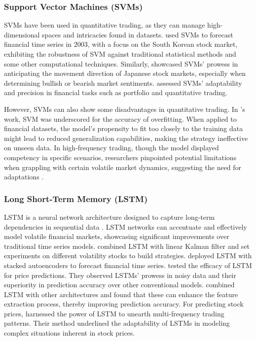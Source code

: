 \documentclass[preprint,12pt]{elsarticle}
\begin{document}
\subsubsection{Support Vector Machines (SVMs)}
SVMs have been used in quantitative trading, as they can manage high-dimensional spaces and intricacies found in datasets. \citet{kim2003financial} used SVMs to forecast financial time series in 2003, with a focus on the South Korean stock market, exhibiting the robustness of SVM against traditional statistical methods and some other computational techniques. Similarly, \citet{huang2005forecasting} showcased SVMs' prowess in anticipating the movement direction of Japanese stock markets, especially when determining bullish or bearish market sentiments. \citet{cavalcante2016computational} assessed SVMs' adaptability and precision in financial tasks such as portfolio and quantitative trading.

However, SVMs can also show some disadvantages in quantitative trading. In \citet{huck2009pairs}'s work, SVM was underscored for the accuracy of overfitting. When applied to financial datasets, the model's propensity to fit too closely to the training data might lead to reduced generalization capabilities, making the strategy ineffective on unseen data. In high-frequency trading, though the model displayed competency in specific scenarios, researchers pinpointed potential limitations when grappling with certain volatile market dynamics, suggesting the need for adaptations \citep{kercheval2015modelling}.

\subsubsection{Long Short-Term Memory (LSTM)}
LSTM is a neural network architecture designed to capture long-term dependencies in sequential data \citep{hochreiter1997LSTM}. LSTM networks can accentuate and effectively model volatile financial markets, showcasing significant improvements over traditional time series models. \citet{orsel2022comparative} combined LSTM with linear Kalman filter and set experiments on different volatility stocks to build strategies. \citet{bao2017deep} deployed LSTM with stacked autoencoders to forecast financial time series. \citet{FISCHER2018LSTM} tested the efficacy of LSTM for price predictions. They observed LSTMs' prowess in noisy data and their superiority in prediction accuracy over other conventional models. \citet{sezer2018algorithmic} combined LSTM with other architectures and found that these can enhance the feature extraction process, thereby improving prediction accuracy. For predicting stock prices, \citet{zhang2017stock} harnessed the power of LSTM to unearth multi-frequency trading patterns. Their method underlined the adaptability of LSTMs in modeling complex situations inherent in stock prices. 
\end{document}
